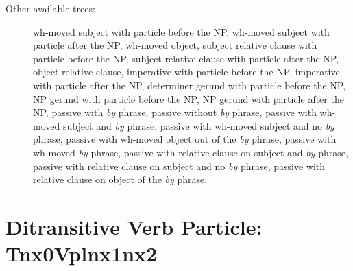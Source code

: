 \begin{description}
\item[Other available trees:] wh-moved subject with particle before the NP,
wh-moved subject with particle after the NP, wh-moved object, subject relative
clause with particle before the NP, subject relative clause with particle after
the NP, object relative clause, imperative with particle before the NP,
imperative with particle after the NP, determiner gerund with particle before
the NP, NP gerund with particle before the NP, NP gerund with particle after
the NP, passive with {\it by} phrase, passive without {\it by} phrase, passive
with wh-moved subject and {\it by} phrase, passive with wh-moved subject and no
{\it by} phrase, passive with wh-moved object out of the {\it by} phrase,
passive with wh-moved {\it by} phrase, passive with relative clause on subject
and {\it by} phrase, passive with relative clause on subject and no {\it by}
phrase, passive with relative clause on object of the {\it by} phrase.

\end{description}




\section{Ditransitive Verb Particle: Tnx0Vplnx1nx2}
\label{nx0Vplnx1nx2}

